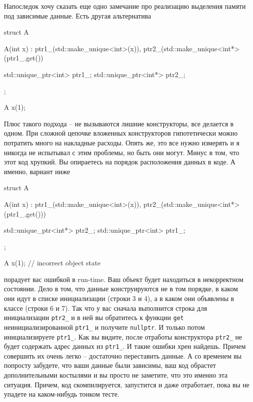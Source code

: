 Напоследок хочу сказать еще одно замечание про реализацию выделения памяти под зависимые данные.
Есть другая альтернатива
\begin{cppcode}
struct A {
  A(int x)
   : ptr1_(std::make_unique<int>(x)),
     ptr2_(std::make_unique<int*>(ptr1_.get()) {}
  
  std::unique_ptr<int> ptr1_;
  std::unique_ptr<int*> ptr2_;
};

A x(1);
\end{cppcode}
Плюс такого подхода -- не вызываются лишние конструкторы, все делается в одном.
При сложной цепочке вложенных конструкторов гипотетически можно потратить много на накладные расходы.
Опять же, это все нужно измерять и я никогда не испытывал с этим проблемы, но быть они могут.
Минус в том, что этот код хрупкий.
Вы опираетесь на порядок расположения данных в коде.
А именно, вариант ниже
\begin{cppcode}
struct A {
  A(int x)
   : ptr1_(std::make_unique<int>(x)),
     ptr2_(std::make_unique<int*>(ptr1_.get())) {}
  
  std::unique_ptr<int*> ptr2_;
  std::unique_ptr<int> ptr1_;
};

A x(1); // incorrect object state
\end{cppcode}
порадует вас ошибкой в run-time.
Ваш объект будет находиться в некорректном состоянии.
Дело в том, что данные конструируются не в том порядке, в каком они идут в списке инициализации (строки 3 и 4), а в каком они объявлены в классе (строки 6 и 7).
Так что у вас сначала выполнится строка для инициализации \verb"ptr2_" и в ней вы обратитесь к функции \verb"get" неинициализированной \verb"ptr1_" и получите \verb"nullptr".
И только потом инициализируете \verb"ptr1_".
Как вы видите, после отработы конструктора \verb"ptr2_" не будет содержать адрес данных из \verb"ptr1_".
И такие ошибки хрен найдешь.
Причем совершить их очень легко -- достаточно переставить данные.
А со временем вы попросту забудете, что ваши данные были зависимы, ваш код обрастет дополнительными костылями и вы просто не заметите, что это именно эта ситуация.
Причем, код скомпилируется, запустится и даже отработает, пока вы не упадете на каком-нибудь тонком тесте.


